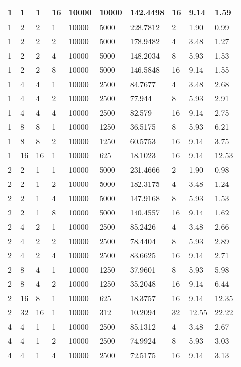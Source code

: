 \begin{appendices}
\begin{table}[H]
\begin{tabular}{|l|l|l|l|l|l|l|l|l|l|}
1 & 1 & 1 & 16 & 10000 & 10000 & 142.4498 & 16 & 9.14 & 1.59 \\ \hline
1 & 2 & 2 & 1 & 10000 & 5000 & 228.7812 & 2 & 1.90 & 0.99 \\ \hline
1 & 2 & 2 & 2 & 10000 & 5000 & 178.9482 & 4 & 3.48 & 1.27 \\ \hline
1 & 2 & 2 & 4 & 10000 & 5000 & 148.2034 & 8 & 5.93 & 1.53 \\ \hline
1 & 2 & 2 & 8 & 10000 & 5000 & 146.5848 & 16 & 9.14 & 1.55 \\ \hline
1 & 4 & 4 & 1 & 10000 & 2500 & 84.7677 & 4 & 3.48 & 2.68 \\ \hline
1 & 4 & 4 & 2 & 10000 & 2500 & 77.944 & 8 & 5.93 & 2.91 \\ \hline
1 & 4 & 4 & 4 & 10000 & 2500 & 82.579 & 16 & 9.14 & 2.75 \\ \hline
1 & 8 & 8 & 1 & 10000 & 1250 & 36.5175 & 8 & 5.93 & 6.21 \\ \hline
1 & 8 & 8 & 2 & 10000 & 1250 & 60.5753 & 16 & 9.14 & 3.75 \\ \hline
1 & 16 & 16 & 1 & 10000 & 625 & 18.1023 & 16 & 9.14 & 12.53 \\ \hline
2 & 2 & 1 & 1 & 10000 & 5000 & 231.4666 & 2 & 1.90 & 0.98 \\ \hline
2 & 2 & 1 & 2 & 10000 & 5000 & 182.3175 & 4 & 3.48 & 1.24 \\ \hline
2 & 2 & 1 & 4 & 10000 & 5000 & 147.9168 & 8 & 5.93 & 1.53 \\ \hline
2 & 2 & 1 & 8 & 10000 & 5000 & 140.4557 & 16 & 9.14 & 1.62 \\ \hline
2 & 4 & 2 & 1 & 10000 & 2500 & 85.2426 & 4 & 3.48 & 2.66 \\ \hline
2 & 4 & 2 & 2 & 10000 & 2500 & 78.4404 & 8 & 5.93 & 2.89 \\ \hline
2 & 4 & 2 & 4 & 10000 & 2500 & 83.6625 & 16 & 9.14 & 2.71 \\ \hline
2 & 8 & 4 & 1 & 10000 & 1250 & 37.9601 & 8 & 5.93 & 5.98 \\ \hline
2 & 8 & 4 & 2 & 10000 & 1250 & 35.2048 & 16 & 9.14 & 6.44 \\ \hline
2 & 16 & 8 & 1 & 10000 & 625 & 18.3757 & 16 & 9.14 & 12.35 \\ \hline
2 & 32 & 16 & 1 & 10000 & 312 & 10.2094 & 32 & 12.55 & 22.22 \\ \hline
4 & 4 & 1 & 1 & 10000 & 2500 & 85.1312 & 4 & 3.48 & 2.67 \\ \hline
4 & 4 & 1 & 2 & 10000 & 2500 & 74.9924 & 8 & 5.93 & 3.03 \\ \hline
4 & 4 & 1 & 4 & 10000 & 2500 & 72.5175 & 16 & 9.14 & 3.13 \\ \hline

\end{tabular}
\end{table}
\end{appendices}
